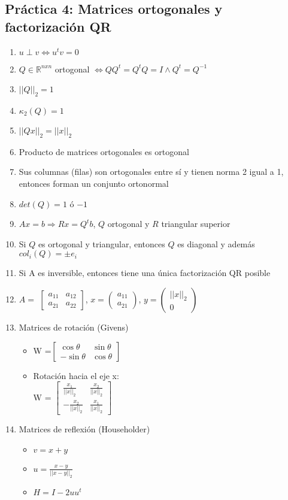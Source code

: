 \subsection*{Práctica 4: Matrices ortogonales y factorización QR}
\begin{enumerate}
    \item $u \perp v \iff u^tv=0$
    \item $Q \in \mathbb{R}^{nxn}$ ortogonal $\iff QQ^t=Q^tQ=I \land Q^t=Q^{-1}$
    \item $||Q||_2 = 1$
    \item $\kappa_2(Q) = 1$
    \item $||Qx||_2=||x||_2$
    \item Producto de matrices ortogonales es ortogonal
    \item Sus columnas (filas) son ortogonales entre sí y tienen norma 2 igual a 1, entonces forman un conjunto ortonormal
    \item $det(Q)= 1$ ó $-1$
    \item $Ax=b \Rightarrow Rx=Q^tb$,  $Q$ ortogonal y $R$ triangular superior
    \item Si $Q$ es ortogonal y triangular, entonces $Q$ es diagonal y además $col_i(Q)=\pm e_i$
    \item Si A es inversible, entonces tiene una única factorización QR posible
    \item $A =$ $ \begin{bmatrix}
a_{11} & a_{12} \\
a_{21} & a_{22} 
\end{bmatrix}  $, $x = \begin{pmatrix}
a_{11} \\
a_{21} 
\end{pmatrix}$, $y =  \begin{pmatrix}
||x||_2 \\
0 
\end{pmatrix}  $
    \item Matrices de rotación (Givens)
    \begin{itemize}
        \item W =$ \begin{bmatrix}
\cos{\theta} & \sin{\theta} \\
-\sin{\theta} & \cos{\theta} 
\end{bmatrix}  $
        \item Rotación hacia el eje x:\\
        W = $ \begin{bmatrix}
\frac{x_1}{||x||_2} & \frac{x_2}{||x||_2} \\
-\frac{x_2}{||x||_2} & \frac{x_1}{||x||_2} 
\end{bmatrix}  $
    \end{itemize}
    \item Matrices de reflexión (Householder)
    \begin{itemize}
        \item $v = x + y$
        \item $u = \frac{x-y}{||x-y||_2}$
        \item $H = I - 2uu^t$
    \end{itemize}
\end{enumerate}